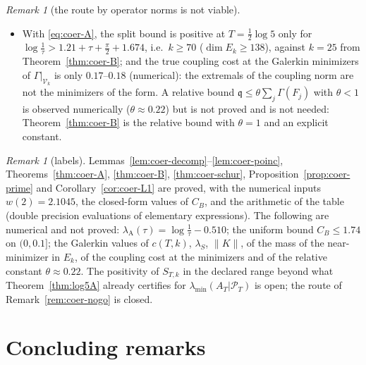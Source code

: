 \documentclass[11pt]{amsart}
\theoremstyle{definition}
\theoremstyle{remark}
\newtheorem{remark}[theorem]{Remark}
\newcommand{\PT}{\mathcal P_T}
\newcommand{\lamA}{\lambda_{\min}(A_T|\PT)}
\begin{document}
\begin{remark}[the route by operator norms is not viable]
\begin{itemize}
\item[(c)] With \eqref{eq:coer-A}, the split bound is positive at $T=\frac12\log5$ only for
$\log\frac1\tau>1.21+\tau+\frac\pi2+1.674$, i.e.\ $k\ge70$ ($\dim E_k\ge138$), against $k=25$ from
Theorem~\ref{thm:coer-B}; and the true coupling cost at the Galerkin minimizers of $\Gamma|_{\mathcal V_k}$ is only
$0.17$--$0.18$ (numerical): the extremals of the coupling norm are not the minimizers of the form. A
relative bound $\mathfrak q\le\theta\sum_j\Gamma(F_j)$ with $\theta<1$ is observed numerically ($\theta\approx0.22$) but is
not proved and is not needed: Theorem~\ref{thm:coer-B} is the relative bound with $\theta=1$ and an explicit constant.
\end{itemize}
\end{remark}

\begin{remark}[labels]\label{rem:coer-labels}
Lemmas~\ref{lem:coer-decomp}--\ref{lem:coer-poinc}, Theorems~\ref{thm:coer-A}, \ref{thm:coer-B}, \ref{thm:coer-schur},
Proposition~\ref{prop:coer-prime} and Corollary~\ref{cor:coer-L1} are proved, with the numerical inputs
$w(2)=2.1045$, the closed-form values of $C_B$, and the arithmetic of the table (double precision evaluations of
elementary expressions). The following are numerical and not proved: $\lambda_{\mathrm A}(\tau)=\log\frac1\tau-0.510$;
the uniform bound $C_B\le1.74$ on $(0,0.1]$; the Galerkin values of $c(T,k)$, $\lambda_S$, $\|K\|$, of the mass of the
near-minimizer in $E_k$, of the coupling cost at the minimizers and of the relative constant $\theta\approx0.22$.
The positivity of $S_{T,k}$ in the declared range beyond what
Theorem~\ref{thm:log5A} already certifies for $\lamA$ is open; the route of Remark~\ref{rem:coer-nogo} is closed.
\end{remark}


\section{Concluding remarks}\label{sec:concluding}
\end{document}
